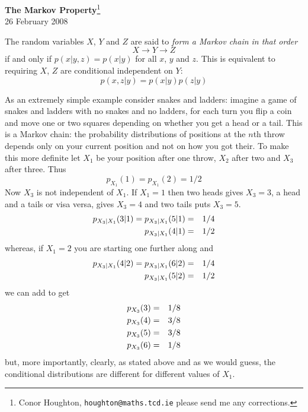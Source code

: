 \documentclass[12pt]{article}
\begin{document}
\begin{center}{\Large
{\bf The Markov Property}\footnote{Conor Houghton, {\tt houghton@maths.tcd.ie} please
send me any corrections.}}\\[1cm] 26 February 2008\\[1cm]
\end{center}
The random variables $X$, $Y$ and $Z$ are said to {\sl form a Markov chain in that order}
\begin{equation}
X\rightarrow Y\rightarrow Z
\end{equation}
if and only if $p(x|y,z)=p(x|y)$ for all $x$, $y$ and $z$. This is equivalent to requiring $X$, $Z$ are conditional independent on $Y$:
\begin{equation}
p(x,z|y)=p(x|y)p(z|y)
\end{equation}

As an extremely simple example consider snakes and ladders: imagine a
game of snakes and ladders with no snakes and no ladders, for each
turn you flip a coin and move one or two squares depending on whether
you get a head or a tail. This is a Markov chain: the probability
distributions of positions at the $n$th throw depends only on your
current position and not on how you got their. To make this more
definite let $X_1$ be your position after one throw, $X_2$ after two
and $X_3$ after three. Thus
\begin{equation}
p_{X_1}(1)=p_{X_1}(2)=1/2
\end{equation}
Now $X_3$ is not independent of $X_1$. If $X_1=1$ then two heads gives $X_3=3$, a head and a tails or visa versa, gives $X_3=4$ and two tails puts $X_3=5$. 
\begin{eqnarray}
p_{X_3|X_1}(3|1)=p_{X_3|X_1}(5|1)&=&1/4\cr
p_{X_3|X_1}(4|1)&=&1/2
\end{eqnarray}
whereas, if $X_1=2$ you are starting one further along and 
\begin{eqnarray}
p_{X_3|X_1}(4|2)=p_{X_3|X_1}(6|2)&=&1/4\cr
p_{X_3|X_1}(5|2)&=&1/2
\end{eqnarray}
we can add to get
\begin{eqnarray}
p_{X_3}(3)&=&1/8\cr
p_{X_3}(4)&=&3/8\cr
p_{X_3}(5)&=&3/8\cr
p_{X_3}(6)&=&1/8\cr
\end{eqnarray}
but, more importantly, clearly, as stated above and as we would guess, the conditional distributions are different for different values of $X_1$. 
\end{document}
